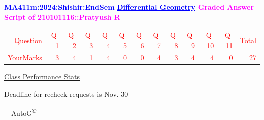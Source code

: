 \documentclass{article}                              %
\begin{document}
%
\vspace*{1in}

\begin{center}
	\textbf{\textcolor{blue}{\LARGE MA411m:2024:Shishir:EndSem}}
	\vskip 1cm
	\textbf{\textcolor{blue}{\underline{\Large Differential Geometry}}}
	\vskip 1cm
	\textbf{\textcolor{magenta}{\LARGE Graded Answer Script of 210101116::Pratyush R}}
\end{center}


\begin{center}
	\Huge 
	\textcolor{red}{
	\begin{tabular}{*{13}{r}}
		Question&Q-1& Q-2& Q-3& Q-4& Q-5& Q-6& Q-7& Q-8& Q-9& Q-10& Q-11&Total  \\
        	YourMarks&3&4&1&4&0&0&4&3&4&4&0&27
	\end{tabular}
	}
        \vskip 2cm
	\large
	\underline{Class Performance Stats}
	\DTLsetseparator{;}
	\begin{table}[htbp]
		\centering
	\end{table}
	\vskip 1cm
	Deadline for recheck requests is Nov. 30
\end{center}
\ \vfill \ \hfill \small AutoG\textsuperscript{\copyright}
\newpage
%
\end{document}
